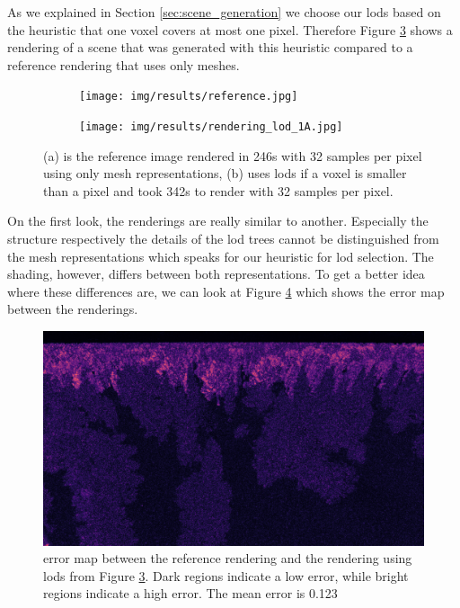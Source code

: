 As we explained in Section \ref{sec:scene_generation} we choose our \acsp{lod} based on the heuristic that one voxel covers at most one pixel.
Therefore Figure \ref{fig:render_comparison} shows a rendering of a scene that was generated with this heuristic compared to a reference rendering that uses only meshes.
\begin{figure}[ht]
    \centering
    \begin{subfigure}[b]{0.9\linewidth}
        \centering
        \texttt{[image: img/results/reference.jpg]}
        \caption{}
        \label{fig:render_comparison_mesh}
    \end{subfigure}
    \begin{subfigure}[b]{0.9\linewidth}
        \centering
        \texttt{[image: img/results/rendering\_lod\_1A.jpg]}
        \caption{}
        \label{fig:render_comparison_lod}
    \end{subfigure}
    \caption[Comparison between mesh and volume renderings of the forest]{(a) is the reference image rendered in 246s with 32 samples per pixel using only mesh representations, (b) uses \acsp{lod} if a voxel is smaller than a pixel and took 342s to render with 32 samples per pixel.}
	\label{fig:render_comparison}
\end{figure}
On the first look, the renderings are really similar to another.
Especially the structure respectively the details of the \acs{lod} trees cannot be distinguished from the mesh representations which speaks for our heuristic for \ac{lod} selection.
The shading, however, differs between both representations.
To get a better idea where these differences are, we can look at Figure \ref{fig:error_map} which shows the \FLIP error map between the renderings.
\begin{figure}[ht]
    \centering
    \includegraphics[width=0.9\linewidth]{img/results/flip_error_1A.jpg}
	\caption[\FLIP error map between reference and default \ac{lod} heuristic.]{\FLIP error map between the reference rendering and the rendering using \acsp{lod} from Figure \ref{fig:render_comparison}. Dark regions indicate a low error, while bright regions indicate a high error. The mean \FLIP error is 0.123}
	\label{fig:error_map}
\end{figure}
